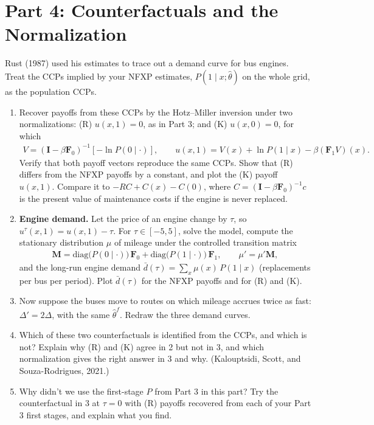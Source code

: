 \documentclass{article}
\begin{document}
\section*{Part 4: Counterfactuals and the Normalization}
Rust (1987) used his estimates to trace out a demand curve for bus engines. Treat the CCPs implied by your NFXP estimates, $P(1 \mid x;\hat\theta)$ on the whole grid, as the population CCPs.
\begin{enumerate}
\item Recover payoffs from these CCPs by the Hotz--Miller inversion under two normalizations: (R) $u(x,1) = 0$, as in Part 3; and (K) $u(x,0) = 0$, for which
\begin{align*}
V = (\mathbf I - \beta \mathbf F_0)^{-1} \left[-\ln P(0 \mid \cdot)\right], \qquad u(x,1) = V(x) + \ln P(1 \mid x) - \beta (\mathbf F_1 V)(x).
\end{align*}
Verify that both payoff vectors reproduce the same CCPs. Show that (R) differs from the NFXP payoffs by a constant, and plot the (K) payoff $u(x,1)$. Compare it to $-RC + C(x) - C(0)$, where $C = (\mathbf I - \beta \mathbf F_0)^{-1} c$ is the present value of maintenance costs if the engine is never replaced.
\item \textbf{Engine demand.} Let the price of an engine change by $\tau$, so $u^\tau(x,1) = u(x,1) - \tau$. For $\tau \in [-5, 5]$, solve the model, compute the stationary distribution $\mu$ of mileage under the controlled transition matrix
\begin{align*}
\mathbf M = \mathrm{diag}\big(P(0 \mid \cdot)\big)\,\mathbf F_0 + \mathrm{diag}\big(P(1 \mid \cdot)\big)\,\mathbf F_1, \qquad \mu' = \mu' \mathbf M,
\end{align*}
and the long-run engine demand $\bar d(\tau) = \sum_x \mu(x)\, P(1 \mid x)$ (replacements per bus per period). Plot $\bar d(\tau)$ for the NFXP payoffs and for (R) and (K).
\item Now suppose the buses move to routes on which mileage accrues twice as fast: $\Delta' = 2\Delta$, with the same $\hat\theta^f$. Redraw the three demand curves.
\item Which of these two counterfactuals is identified from the CCPs, and which is not? Explain why (R) and (K) agree in 2 but not in 3, and which normalization gives the right answer in 3 and why. (Kalouptsidi, Scott, and Souza-Rodrigues, 2021.)
\item Why didn't we use the first-stage $\hat P$ from Part 3 in this part? Try the counterfactual in 3 at $\tau = 0$ with (R) payoffs recovered from each of your Part 3 first stages, and explain what you find.
\end{enumerate}
\end{document}
